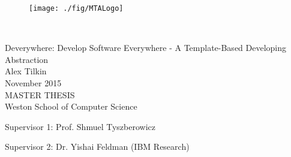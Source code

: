 \thispagestyle{empty}

\begin{figure}
\centering
\texttt{[image: ./fig/MTALogo]}
\end{figure}

\mbox{}\\[6pc]
\begin{center}
\Huge{Deverywhere: Develop Software Everywhere - A Template-Based Developing Abstraction}\\[2pc]

\Large{Alex Tilkin}\\[1pc]
\large{November 2015}\\[2pc]

MASTER THESIS\\
Weston School of Computer Science\\
\end{center}
\vfill

\noindent Supervisor 1: Prof. Shmuel Tyszberowicz

\noindent Supervisor 2: Dr. Yishai Feldman (IBM Research)

